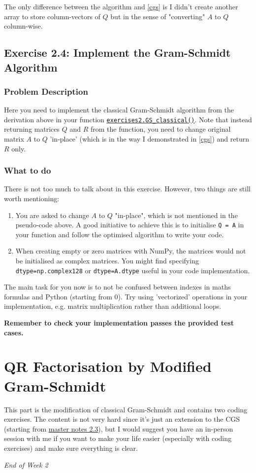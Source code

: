 \noindent The only difference between the algorithm and \autoref{cgs} is I didn't create another array to store column-vectors of \(Q\) but in the sense of "converting" \(A\)  to \(Q\)  column-wise.
\newpage
\subsection*{Exercise 2.4: Implement the Gram-Schmidt Algorithm}
\subsubsection*{Problem Description}%
Here you need to implement the classical Gram-Schmidt algorithm from the derivation above in your function \href{https://comp-lin-alg.github.io/cla_utils.html#cla_utils.exercises2.GS_classical}{\texttt{exercises2.GS\_classical()}}. Note that instead returning matrices \(Q\) and \(R\) from the function, you need to change original matrix \(A\) to \(Q\) 'in-place' (which is in the way I demonstrated in \autoref{cgs}) and return \(R\) only.
\subsubsection*{What to do}
There is not too much to talk about in this exercise. However, two things are still worth mentioning:
\begin{enumerate}
  \item You are asked to change \(A\)  to \(Q\)  "in-place", which is not mentioned in the pseudo-code above. A good initiative to achieve this is to initialise \texttt{Q = A} in your function and follow the optimised algorithm to write your code. 
  \item When creating empty or zero matrices with NumPy, the matrices would not be initialised as complex matrices. You might find specifying \texttt{dtype=np.complex128} or \texttt{dtype=A.dtype} useful in your code implementation.  
\end{enumerate}
The main task for you now is to not be confused between indexes in maths formulas and Python (starting from 0). Try using 'vectorized' operations in your implementation, e.g. matrix multiplication rather than additional loops. \medskip

\noindent \textbf{Remember to check your implementation passes the provided test cases.}

\section{QR Factorisation by Modified Gram-Schmidt}
This part is the modification of classical Gram-Schmidt and contains two coding exercises. The content is not very hard since it's just an extension to the CGS (starting from \href{https://comp-lin-alg.github.io/L2_QR_factorisation.html#projector-interpretation-of-gram-schmidt}{master notes 2.3}), but I would suggest you have an in-person session with me if you want to make your life easier (especially with coding exercises) and make sure everything is clear.
\bigskip

\begin{center}
  \textit{\large End of Week 2}
\end{center}